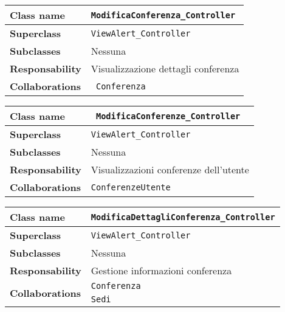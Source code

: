 \begin{table}[h!]
	\begin{tabular}{|l|l|}
		\hline 
		\textbf{Class name} & \texttt{ModificaConferenza\_Controller}
		\\ \hline
		\textbf{Superclass} & \texttt{ViewAlert\_Controller}
		\\ \hline
		\multirow{1}{*}{\textbf{Subclasses}} & Nessuna
		\\ \hline
		\textbf{Responsability} & Visualizzazione dettagli conferenza
		\\ \hline
		\multirow{1}{*}{\textbf{Collaborations}} &\texttt{ Conferenza}
		\\ \hline
	\end{tabular}
\end{table}

\begin{table}[h!]
	\begin{tabular}{|l|l|}
		\hline 
		\textbf{Class name} &\texttt{ ModificaConferenze\_Controller}
		\\ \hline
		\textbf{Superclass} & \texttt{ViewAlert\_Controller}
		\\ \hline
		\multirow{1}{*}{\textbf{Subclasses}} & Nessuna
		\\ \hline
		\textbf{Responsability} & Visualizzazioni conferenze dell'utente
		\\ \hline
		\multirow{1}{*}{\textbf{Collaborations}} & \texttt{ConferenzeUtente}
		\\ \hline
	\end{tabular}
\end{table}
\begin{table}[h!]
	\begin{tabular}{|l|l|}
		\hline 
		\textbf{Class name} & \texttt{ModificaDettagliConferenza\_Controller}
		\\ \hline
		\textbf{Superclass} & \texttt{ViewAlert\_Controller}
		\\ \hline
		\multirow{1}{*}{\textbf{Subclasses}} & Nessuna
		\\ \hline
		\textbf{Responsability} & Gestione informazioni conferenza
		\\ \hline
		\multirow{2}{*}{\textbf{Collaborations}} & \texttt{Conferenza} \\
		& \texttt{Sedi }
		\\ \hline
	\end{tabular}
\end{table}

